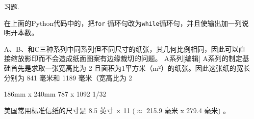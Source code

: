 \documentclass[main.tex]{subfiles}
\begin{document}
\begin{kaishu}习题.\end{kaishu} 在上面的Python代码中的，把\texttt{for} 循环句改为\texttt{while}循环句，并且使输出加一列说明开本数。

A、B、和C三种系列中同系列但不同尺寸的纸张，其几何比例相同，因此可以直接缩放影印而不会造成纸面图案有边缘裁切的问题。
A系列[编辑]
A系列的制定基础首先是求取一张宽高比为
2
且面积为1平方米（m²）的纸张。因此这张纸的宽长分别为 841 毫米和 1189 毫米（宽高比为
2



186mm x 240mm
787 x 1092 1/32 


美国常用标准信纸的尺寸是 8.5 英寸 × 11 ($\approx$ 215.9 毫米 x 279.4 毫米) 。
\newpage
\end{document}

